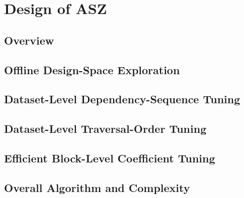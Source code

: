 \section{Design of ASZ}\label{sec:asz}

\subsection{Overview}

\subsection{Offline Design-Space Exploration}

\subsection{Dataset-Level Dependency-Sequence Tuning}

\subsection{Dataset-Level Traversal-Order Tuning}

\subsection{Efficient Block-Level Coefficient Tuning}

\subsection{Overall Algorithm and Complexity}
